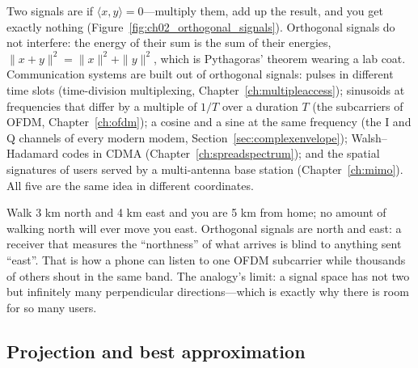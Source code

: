 Two signals are  if $\langle x,y\rangle=0$---multiply them, add up the result,
and you get exactly nothing (Figure~\ref{fig:ch02_orthogonal_signals}). Orthogonal signals do not
interfere: the energy of their sum is the sum of their energies, $\|x+y\|^2=\|x\|^2+\|y\|^2$, which is
Pythagoras' theorem wearing a lab coat. Communication systems are built out of orthogonal signals:
pulses in different time slots (time-division multiplexing, Chapter~\ref{ch:multipleaccess});
sinusoids at frequencies that differ by a multiple of $1/T$ over a duration $T$ (the subcarriers of
OFDM, Chapter~\ref{ch:ofdm}); a cosine and a sine at the same frequency (the I and Q channels of
every modern modem, Section~\ref{sec:complexenvelope}); Walsh--Hadamard codes in CDMA
(Chapter~\ref{ch:spreadspectrum}); and the spatial signatures of users served by a multi-antenna base
station (Chapter~\ref{ch:mimo}). All five are the same idea in different coordinates.


\begin{analogy}
Walk 3 km north and 4 km east and you are 5 km from home; no amount of walking north will ever
move you east. Orthogonal signals are north and east: a receiver that measures the ``northness'' of
what arrives is blind to anything sent ``east''. That is how a phone can listen to one OFDM
subcarrier while thousands of others shout in the same band. The analogy's limit: a signal space has
not two but infinitely many perpendicular directions---which is exactly why there is room for so many
users.
\end{analogy}

\subsection{Projection and best approximation}

